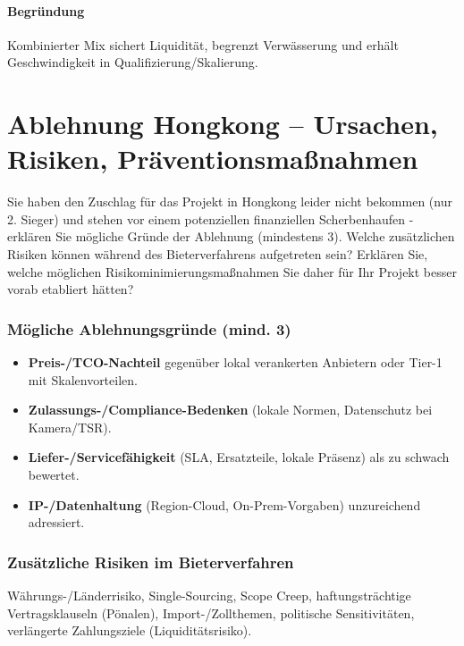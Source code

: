 \documentclass[
%
ngerman %
%
numeric %
]{wbh-assignment}
\begin{document}
\paragraph{Begründung}
Kombinierter Mix sichert Liquidität, begrenzt Verwässerung und erhält Geschwindigkeit in Qualifizierung/Skalierung.

\clearpage

\section{Ablehnung Hongkong – Ursachen, Risiken, Präventionsmaßnahmen}
\label{sec:5}

\begin{aufgabenstellung}
Sie haben den Zuschlag für das Projekt in Hongkong leider nicht bekommen (nur 2. Sieger) und stehen vor einem potenziellen finanziellen Scherbenhaufen - erklären Sie mögliche Gründe der Ablehnung (mindestens 3).
Welche zusätzlichen Risiken können während des Bieterverfahrens aufgetreten sein? Erklären Sie, welche möglichen Risikominimierungsmaßnahmen Sie daher für Ihr Projekt besser vorab etabliert hätten?
\end{aufgabenstellung}

\vspace*{5mm}

\subsubsection{Mögliche Ablehnungsgründe (mind. 3)}
\begin{itemize}
  \item \textbf{Preis-/TCO-Nachteil} gegenüber lokal verankerten Anbietern oder Tier-1 mit Skalenvorteilen.
  \item \textbf{Zulassungs-/Compliance-Bedenken} (lokale Normen, Datenschutz bei Kamera/TSR).
  \item \textbf{Liefer-/Servicefähigkeit} (SLA, Ersatzteile, lokale Präsenz) als zu schwach bewertet.
  \item \textbf{IP-/Datenhaltung} (Region-Cloud, On-Prem-Vorgaben) unzureichend adressiert.
\end{itemize}

\subsubsection{Zusätzliche Risiken im Bieterverfahren}
Währungs-/Länderrisiko, Single-Sourcing, Scope Creep, haftungsträchtige Vertragsklauseln (Pönalen), Import-/Zollthemen, politische Sensitivitäten, verlängerte Zahlungsziele (Liquiditätsrisiko).
\end{document}
